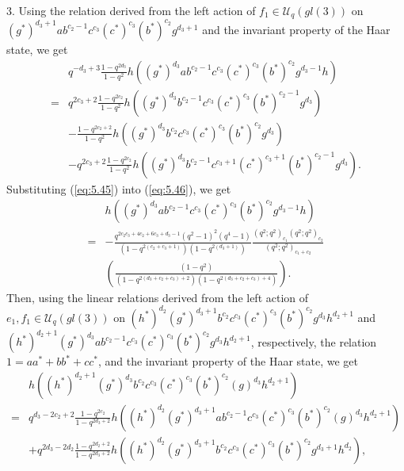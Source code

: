 \documentclass[table,a4paper,reqno]{amsart}
\numberwithin{equation}{section}
\theoremstyle{definition}
\begin{document}
3. Using the relation derived from the left action of $f_1\in\mathcal{U}_q(gl(3))$ on\\ $(g^*)^{d_3+1}ab^{c_2-1}c^{c_3}(c^*)^{c_3}(b^*)^{c_2}g^{d_3+1}$ and the invariant property of the Haar state, we get
\begin{equation}\label{eq:5.46}
    \begin{split}
        &q^{-d_3+3}\frac{1-q^{2d_3}}{1-q^2}h\left((g^*)^{d_3}ab^{c_2-1}c^{c_3}(c^*)^{c_3}(b^*)^{c_2}g^{d_3-1}h\right)\\
        =&q^{2c_3+2}\frac{1-q^{2c_2}}{1-q^2}h\left((g^*)^{d_3}b^{c_2-1}c^{c_3}(c^*)^{c_3}(b^*)^{c_2-1}g^{d_3}\right)\\
        &-\frac{1-q^{2c_2+2}}{1-q^2}h\left((g^*)^{d_3}b^{c_2}c^{c_3}(c^*)^{c_3}(b^*)^{c_2}g^{d_3}\right)\\
        &-q^{2c_3+2}\frac{1-q^{2c_2}}{1-q^2}h\left((g^*)^{d_3}b^{c_2-1}c^{c_3+1}(c^*)^{c_3+1}(b^*)^{c_2-1}g^{d_3}\right).
    \end{split}
\end{equation}
Substituting (\ref{eq:5.45}) into (\ref{eq:5.46}), we get
\begin{equation}\label{eq:5.47}
    \begin{split}
         &h\left((g^*)^{d_3}ab^{c_2-1}c^{c_3}(c^*)^{c_3}(b^*)^{c_2}g^{d_3-1}h\right)\\
        =&-\frac{q^{2c_2c_3+4c_2+6c_3+d_3-1}(q^2-1)^2(q^4-1)}{(1-q^{2(c_2+c_3+1)})(1-q^{2(d_3+1)})}\frac{(q^2;q^2)_{c_1}(q^2;q^2)_{c_2}}{(q^2;q^2)_{c_1+c_2}}\\
        &\left(\frac{(1-q^2)}{(1-q^{2(d_3+c_2+c_3)+2})(1-q^{2(d_3+c_2+c_3)+4})}\right).
    \end{split}
\end{equation}
Then, using the linear relations derived from the left action of $e_1, f_1\in\mathcal{U}_q(gl(3))$ on $(h^*)^{d_2}(g^*)^{d_3+1}b^{c_2}c^{c_3}(c^*)^{c_3}(b^*)^{c_2}g^{d_3}h^{d_2+1}$ and\\ $(h^*)^{d_2+1}(g^*)^{d_3}ab^{c_2-1}c^{c_3}(c^*)^{c_3}(b^*)^{c_2}g^{d_3}h^{d_2+1}$, respectively, the relation $1=aa^*+bb^*+cc^*$, and the invariant property of the Haar state, we get
\begin{equation}\label{eq:5.48}
    \begin{split}
        &h\left((h^*)^{d_2+1}(g^*)^{d_3}b^{c_2}c^{c_3}(c^*)^{c_3}(b^*)^{c_2}(g)^{d_3}h^{d_2+1}\right)\\
        =&q^{d_3-2c_2+2}\frac{1-q^{2c_2}}{1-q^{2d_3+2}}h\left((h^*)^{d_2}(g^*)^{d_3+1}ab^{c_2-1}c^{c_3}(c^*)^{c_3}(b^*)^{c_2}(g)^{d_3}h^{d_2+1}\right)\\
        &+q^{2d_3-2d_2}\frac{1-q^{2d_2+2}}{1-q^{2d_3+2}}h\left((h^*)^{d_2}(g^*)^{d_3+1}b^{c_2}c^{c_3}(c^*)^{c_3}(b^*)^{c_2}g^{d_3+1}h^{d_2}\right),
    \end{split}
\end{equation}
\end{document}
